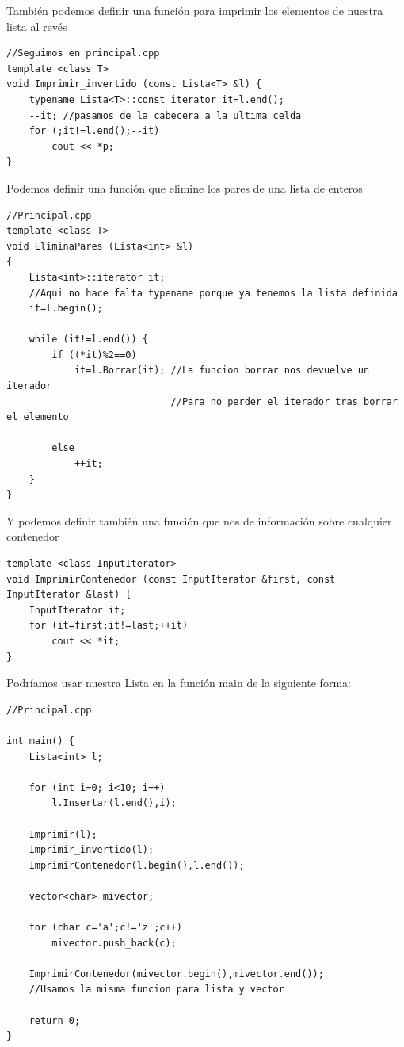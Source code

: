 \documentclass[10pt,a4paper,spanish]{report}
\begin{document}
\noindent
También podemos definir una función para imprimir los elementos de nuestra lista al revés
\begin{verbatim}
//Seguimos en principal.cpp
template <class T>
void Imprimir_invertido (const Lista<T> &l) {
    typename Lista<T>::const_iterator it=l.end();
    --it; //pasamos de la cabecera a la ultima celda
    for (;it!=l.end();--it)
        cout << *p;
}
\end{verbatim}

\noindent
Podemos definir una función que elimine los pares de una lista de enteros
\begin{verbatim}
//Principal.cpp
template <class T>
void EliminaPares (Lista<int> &l)
{
    Lista<int>::iterator it;
    //Aqui no hace falta typename porque ya tenemos la lista definida
    it=l.begin();

    while (it!=l.end()) {
        if ((*it)%2==0)
            it=l.Borrar(it); //La funcion borrar nos devuelve un iterador
                             //Para no perder el iterador tras borrar el elemento

        else
            ++it;
    }
}
\end{verbatim}

\noindent
Y podemos definir también una función que nos de información sobre cualquier contenedor
\begin{verbatim}
template <class InputIterator>
void ImprimirContenedor (const InputIterator &first, const InputIterator &last) {
    InputIterator it;
    for (it=first;it!=last;++it)
        cout << *it;
}
\end{verbatim}

\noindent
Podríamos usar nuestra Lista en la función main de la siguiente forma:
\begin{verbatim}
//Principal.cpp

int main() {
    Lista<int> l;

    for (int i=0; i<10; i++)
        l.Insertar(l.end(),i);

    Imprimir(l);
    Imprimir_invertido(l);
    ImprimirContenedor(l.begin(),l.end());

    vector<char> mivector;

    for (char c='a';c!='z';c++)
        mivector.push_back(c);

    ImprimirContenedor(mivector.begin(),mivector.end());
    //Usamos la misma funcion para lista y vector

    return 0;
}
\end{verbatim}
\end{document}
